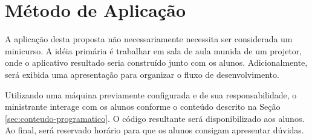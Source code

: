 \documentclass{article}
\begin{document}
\section{Método de Aplicação}
\label{sec:metodo-de-aplicacao}

A aplicação desta proposta não necessariamente necessita ser considerada um
minicurso. A idéia primária é trabalhar em sala de aula munida de um projetor,
onde o aplicativo resultado seria construído junto com os alunos.
Adicionalmente, será exibida uma apresentação para organizar o fluxo de
desenvolvimento.

Utilizando uma máquina previamente configurada e de sua responsabilidade, o
ministrante interage com os alunos conforme o conteúdo descrito na Seção
\ref{sec:conteudo-programatico}. O código resultante será disponibilizado aos
alunos. Ao final, será reservado horário para que os alunos consigam apresentar
dúvidas.



\end{document}
